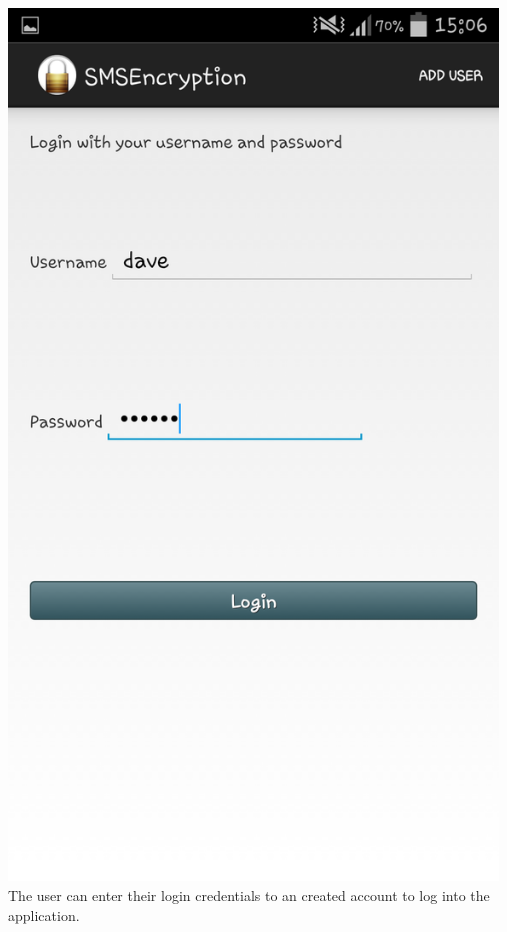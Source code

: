 \begin{center}
 \includegraphics[width=13cm]{screenshots/normal/2_LoginScreenFilledIn.png}
\textbf{\\}
The user can enter their login credentials to an created account to log into the application.
\end{center}
